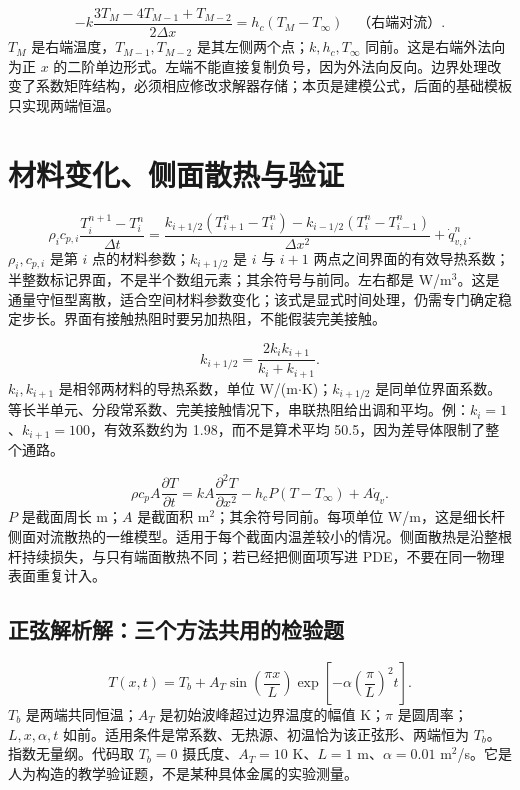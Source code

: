 \begin{equation}
-k\frac{3T_M-4T_{M-1}+T_{M-2}}{2\Delta x}
=h_c(T_M-T_\infty)\quad\text{（右端对流）}.
\end{equation}
$T_M$ 是右端温度，$T_{M-1},T_{M-2}$ 是其左侧两个点；$k,h_c,T_\infty$ 同前。这是右端外法向为正 $x$ 的二阶单边形式。左端不能直接复制负号，因为外法向反向。边界处理改变了系数矩阵结构，必须相应修改求解器存储；本页是建模公式，后面的基础模板只实现两端恒温。

\section{材料变化、侧面散热与验证}
\begin{equation}
\rho_i c_{p,i}\frac{T_i^{n+1}-T_i^n}{\Delta t}
=\frac{k_{i+1/2}(T_{i+1}^n-T_i^n)-k_{i-1/2}(T_i^n-T_{i-1}^n)}{\Delta x^2}+\dot q_{v,i}^n.
\end{equation}
$\rho_i,c_{p,i}$ 是第 $i$ 点的材料参数；$k_{i+1/2}$ 是 $i$ 与 $i+1$ 两点之间界面的有效导热系数；半整数标记界面，不是半个数组元素；其余符号与前同。左右都是 W/m$^3$。这是通量守恒型离散，适合空间材料参数变化；该式是显式时间处理，仍需专门确定稳定步长。界面有接触热阻时要另加热阻，不能假装完美接触。

\begin{equation}
k_{i+1/2}=\frac{2k_i k_{i+1}}{k_i+k_{i+1}}.
\end{equation}
$k_i,k_{i+1}$ 是相邻两材料的导热系数，单位 W/(m$\cdot$K)；$k_{i+1/2}$ 是同单位界面系数。等长半单元、分段常系数、完美接触情况下，串联热阻给出调和平均。例：$k_i=1$、$k_{i+1}=100$，有效系数约为 1.98，而不是算术平均 50.5，因为差导体限制了整个通路。

\begin{equation}
\rho c_p A\frac{\partial T}{\partial t}
=kA\frac{\partial^2T}{\partial x^2}-h_cP(T-T_\infty)+A\dot q_v.
\end{equation}
$P$ 是截面周长 m；$A$ 是截面积 m$^2$；其余符号同前。每项单位 W/m，这是细长杆侧面对流散热的一维模型。适用于每个截面内温差较小的情况。侧面散热是沿整根杆持续损失，与只有端面散热不同；若已经把侧面项写进 PDE，不要在同一物理表面重复计入。

\subsection{正弦解析解：三个方法共用的检验题}
\begin{equation}
T(x,t)=T_b+A_T\sin\left(\frac{\pi x}{L}\right)
\exp\left[-\alpha\left(\frac{\pi}{L}\right)^2t\right].
\end{equation}
$T_b$ 是两端共同恒温；$A_T$ 是初始波峰超过边界温度的幅值 K；$\pi$ 是圆周率；$L,x,\alpha,t$ 如前。适用条件是常系数、无热源、初温恰为该正弦形、两端恒为 $T_b$。指数无量纲。代码取 $T_b=0$ 摄氏度、$A_T=10$ K、$L=1$ m、$\alpha=0.01$ m$^2$/s。它是人为构造的教学验证题，不是某种具体金属的实验测量。

